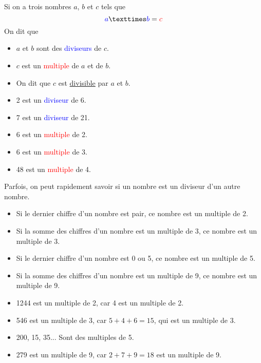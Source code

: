 \documentclass[../€Cours-complet/Cours-complet]{subfiles}
\begin{document}
\maketitleCours

\begin{cours}
	Si on a trois nombres $a$, $b$ et $c$ tels que
	$$ \textcolor{blue}{a} × \textcolor{blue}{b} = \textcolor{red}{c} $$
	On dit que
	\begin{itemize}
		\setlength\itemsep{0.3em}
		\item $a$ et $b$ sont des \textcolor{blue}{diviseurs} de $c$.
		\item $c$ est un \textcolor{red}{multiple} de $a$ et de $b$.
		\item On dit que $c$ est \uline{divisible} par $a$ et $b$.
	\end{itemize}
\end{cours}

\begin{exemple}
	\begin{itemize}
		\setlength\itemsep{0.3em}
		\item 2 est un \textcolor{blue}{diviseur} de 6.
		\item 7 est un \textcolor{blue}{diviseur} de 21.
		\item 6 est un \textcolor{red}{multiple} de 2.
		\item 6 est un \textcolor{red}{multiple} de 3.
		\item 48 est un \textcolor{red}{multiple} de 4.
	\end{itemize}
\end{exemple}

\begin{cours} \label{cours:criteres-de-divisibilite}
	Parfois, on peut rapidement savoir si un nombre est un diviseur d'un autre nombre. \\
	\begin{itemize}
		\setlength\itemsep{0.3em}
		\item Si le dernier chiffre d'un nombre est pair, ce nombre est un multiple de 2.
		\item Si la somme des chiffres d'un nombre est un multiple de 3, ce nombre est un multiple de 3.
		\item Si le dernier chiffre d'un nombre est 0 ou 5, ce nombre est un multiple de 5.
		\item Si la somme des chiffres d'un nombre est un multiple de 9, ce nombre est un multiple de 9.
	\end{itemize}
\end{cours}

\begin{exemple}
	\begin{itemize}
		\setlength\itemsep{0.3em}
		\item 1244 est un multiple de 2, car 4 est un multiple de 2.
		\item 546 est un multiple de 3, car $5 + 4 + 6 = 15$, qui est un multiple de 3.
		\item 200, 15, 35... Sont des multiples de 5.
		\item 279 est un multiple de 9, car $2 + 7 + 9 = 18$ est un multiple de 9.
	\end{itemize}
\end{exemple}
\end{document}
